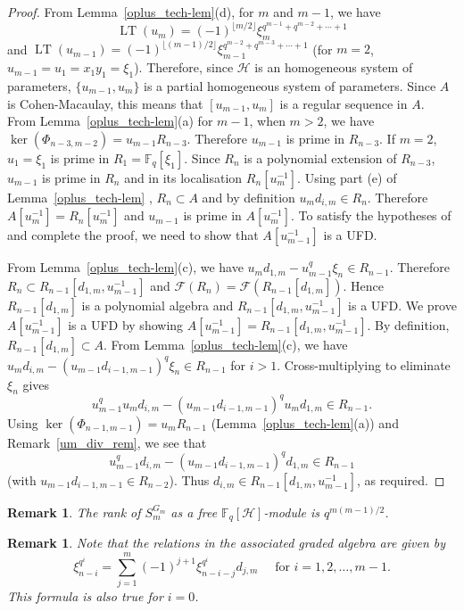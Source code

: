 \documentclass{amsart}
\newcommand{\field}{\mathbb{F}}
\newcommand{\invring}{S_m^{G_m}}
\newcommand{\F}{\mathcal{F}}
\newcommand{\HH}{\mathcal{H}}
\newtheorem{remark}[subsection]{Remark}
\DeclareMathOperator{\lt}{LT}
\begin{document}
\begin{proof}
From Lemma~\ref{oplus_tech-lem}(d), for $m$ and $m-1$, we have 
$$\lt(u_m)=(-1)^{\lfloor m/2 \rfloor}\xi_{m}^{q^{m-1}+q^{m-2}+\cdots+1}$$ and $\lt(u_{m-1})=(-1)^{\lfloor (m-1)/2 \rfloor}\xi_{m-1}^{q^{m-2}+q^{m-3}+\cdots+1}$ (for $m=2$, $u_{m-1}=u_1=x_1y_1=\xi_1$).
Therefore, since $\HH$ is an homogeneous system of parameters, $\{u_{m-1},u_m\}$ is a partial homogeneous system of parameters. Since $A$ is Cohen-Macaulay, this means that 
$[u_{m-1},u_m]$ is a regular sequence in $A$. From 
Lemma~\ref{oplus_tech-lem}(a) for $m-1$, when $m>2$, we have $\ker(\Phi_{n-3,m-2})=u_{m-1} R_{n-3}$. Therefore $u_{m-1}$ is prime in $R_{n-3}$. If $m=2$, $u_1=\xi_1$ is prime in $R_1=\field_q[\xi_1]$.
Since $R_{n}$ is a polynomial extension of $R_{n-3}$, $u_{m-1}$ is prime in $R_{n}$ and in its localisation $R_{n}[u_m^{-1}]$.
Using part (e) of Lemma~\ref{oplus_tech-lem} , $R_{n}\subset A$ and by definition 
$u_m d_{i,m}\in R_{n}$. Therefore $A[u_m^{-1}]=R_{n}[u_m^{-1}]$ and
$u_{m-1}$ is prime in $A[u_m^{-1}]$. To satisfy the hypotheses of \cite[Proposition 1.1]{Kropholler+Rajaei+Segal:05} and complete the proof, we need to show that
$A[u_{m-1}^{-1}]$ is a UFD. 

From Lemma~\ref{oplus_tech-lem}(c), we have $u_m d_{1,m}-u_{m-1}^q\xi_{n}\in R_{n-1}$. 
Therefore $R_{n}\subset R_{n-1}[d_{1,m}, u_{m-1}^{-1}]$ and
$\F(R_{n})=\F(R_{n-1}[d_{1,m}])$. Hence $R_{n-1}[d_{1,m}]$ is a polynomial algebra and 
$R_{n-1}[d_{1,m}, u_{m-1}^{-1}]$ is a UFD.
We prove $A[u_{m-1}^{-1}]$ is a UFD by showing  $A[u_{m-1}^{-1}]=R_{n-1}[d_{1,m},u_{m-1}^{-1}]$. By definition, $R_{n-1}[d_{1,m}]\subset A$.
From Lemma~\ref{oplus_tech-lem}(c), we have $u_m d_{i,m}-(u_{m-1}d_{i-1,m-1})^q\xi_{n}\in R_{n-1}$ for $i>1$. Cross-multiplying to eliminate $\xi_{n}$ gives
$$u_{m-1}^q u_m d_{i,m}- (u_{m-1}d_{i-1,m-1})^qu_m d_{1,m}\in R_{n-1}.$$ 
Using $\ker(\Phi_{n-1,m-1})=u_m R_{n-1}$ (Lemma~\ref{oplus_tech-lem}(a)) and
Remark~\ref{um_div_rem}, we see that 
$$u_{m-1}^q d_{i,m}- (u_{m-1}d_{i-1,m-1})^q d_{1,m}\in R_{n-1}$$ (with $u_{m-1}d_{i-1,m-1}\in R_{n-2}$). Thus $d_{i,m}\in R_{n-1}[d_{1,m},u_{m-1}^{-1}]$, as required.
\end{proof}

\begin{remark}
    The rank of $\invring$ as a free $\field_q[\HH]$-module is $q^{m(m-1)/2}$.
\end{remark}

\begin{remark}
  Note that the relations in the associated graded algebra are given by
  $$\xi_{n-i}^{q^i}=\sum_{j=1}^m (-1)^{j+1}\xi_{n-i-j}^{q^i}d_{j,m} \quad
  \text{ for } i=1,2,\dots,m-1.$$
  This formula is also true for $i=0$.
\end{remark}
\end{document}
